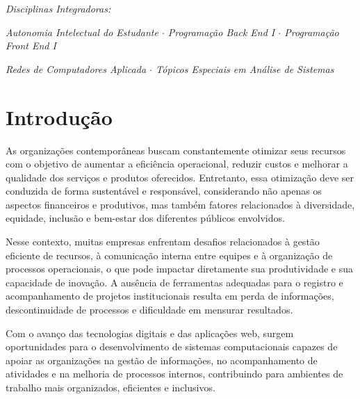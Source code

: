 \documentclass[a4paper,12pt,oneside]{article}
\begin{document}
\begin{titlepage}
\vspace{0.75cm}
{\footnotesize\itshape\color{mutedsoft} Disciplinas Integradoras:\par}
\vspace{0.12cm}
{\footnotesize\itshape\color{mutedsoft} Autonomia Intelectual do Estudante $\cdot$ Programação Back End I $\cdot$ Programação Front End I\par}
\vspace{0.12cm}
{\footnotesize\itshape\color{mutedsoft} Redes de Computadores Aplicada $\cdot$ Tópicos Especiais em Análise de Sistemas\par}
\vspace*{0.6cm}
\end{titlepage}

\newpage
\tableofcontents
\newpage

\section{Introdução}

As organizações contemporâneas buscam constantemente otimizar seus recursos com o objetivo de aumentar a eficiência operacional, reduzir custos e melhorar a qualidade dos serviços e produtos oferecidos. Entretanto, essa otimização deve ser conduzida de forma sustentável e responsável, considerando não apenas os aspectos financeiros e produtivos, mas também fatores relacionados à diversidade, equidade, inclusão e bem-estar dos diferentes públicos envolvidos.

Nesse contexto, muitas empresas enfrentam desafios relacionados à gestão eficiente de recursos, à comunicação interna entre equipes e à organização de processos operacionais, o que pode impactar diretamente sua produtividade e sua capacidade de inovação. A ausência de ferramentas adequadas para o registro e acompanhamento de projetos institucionais resulta em perda de informações, descontinuidade de processos e dificuldade em mensurar resultados.

Com o avanço das tecnologias digitais e das aplicações web, surgem oportunidades para o desenvolvimento de sistemas computacionais capazes de apoiar as organizações na gestão de informações, no acompanhamento de atividades e na melhoria de processos internos, contribuindo para ambientes de trabalho mais organizados, eficientes e inclusivos.
\end{document}
